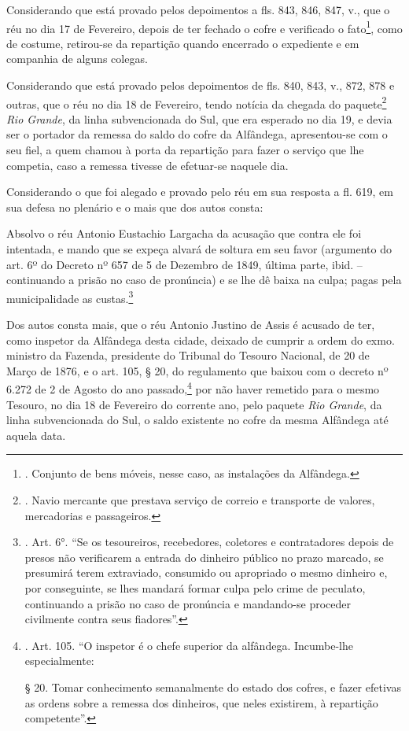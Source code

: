 Considerando que está provado pelos depoimentos a fls. 843, 846, 847,
v., que o réu no dia 17 de Fevereiro, depois de ter fechado o cofre e
verificado o fato\footnote{. Conjunto de bens móveis, nesse caso, as
  instalações da Alfândega.}, como de costume, retirou-se da repartição
quando encerrado o expediente e em companhia de alguns colegas.

Considerando que está provado pelos depoimentos de fls. 840, 843, v.,
872, 878 e outras, que o réu no dia 18 de Fevereiro, tendo notícia da
chegada do paquete\footnote{. Navio mercante que prestava serviço de
  correio e transporte de valores, mercadorias e passageiros.} \emph{Rio
Grande}, da linha subvencionada do Sul, que era esperado no dia 19, e
devia ser o portador da remessa do saldo do cofre da Alfândega,
apresentou-se com o seu fiel, a quem chamou à porta da repartição para
fazer o serviço que lhe competia, caso a remessa tivesse de efetuar-se
naquele dia.

Considerando o que foi alegado e provado pelo réu em sua resposta a fl.
619, em sua defesa no plenário e o mais que dos autos consta:

Absolvo o réu Antonio Eustachio Largacha da acusação que contra ele foi
intentada, e mando que se expeça alvará de soltura em seu favor
(argumento do art. 6º do Decreto nº 657 de 5 de Dezembro de 1849, última
parte, ibid. -- continuando a prisão no caso de pronúncia) e se lhe dê
baixa na culpa; pagas pela municipalidade as custas.\footnote{. Art. 6°.
  ``Se os tesoureiros, recebedores, coletores e contratadores depois de
  presos não verificarem a entrada do dinheiro público no prazo marcado,
  se presumirá terem extraviado, consumido ou apropriado o mesmo
  dinheiro e, por conseguinte, se lhes mandará formar culpa pelo crime
  de peculato, continuando a prisão no caso de pronúncia e mandando-se
  proceder civilmente contra seus fiadores''.}

Dos autos consta mais, que o réu Antonio Justino de Assis é acusado de
ter, como inspetor da Alfândega desta cidade, deixado de cumprir a ordem
do exmo. ministro da Fazenda, presidente do Tribunal do Tesouro
Nacional, de 20 de Março de 1876, e o art. 105, § 20, do regulamento que
baixou com o decreto nº 6.272 de 2 de Agosto do ano passado,\footnote{.
  Art. 105. ``O inspetor é o chefe superior da alfândega. Incumbe-lhe
  especialmente:

  § 20. Tomar conhecimento semanalmente do estado dos cofres, e fazer
  efetivas as ordens sobre a remessa dos dinheiros, que neles existirem,
  à repartição competente''.} por não haver remetido para o mesmo
Tesouro, no dia 18 de Fevereiro do corrente ano, pelo paquete \emph{Rio
Grande}, da linha subvencionada do Sul, o saldo existente no cofre da
mesma Alfândega até aquela data.

